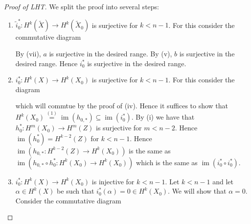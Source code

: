 \documentclass[A4paper, british]{amsart}
\theoremstyle{darkgreentheorem}
\theoremstyle{darkbluedefinition}
\theoremstyle{darkredexample}
\theoremstyle{remark}
\DeclareMathOperator{\im}{im}
\newcommand{\1}{\mathbbm{1}}
\newcommand{\op}{\oplus}
\newcommand{\sub}{\subseteq}
\begin{document}
\begin{proof}[Proof of LHT]
    We split the proof into several steps:
    \begin{enumerate}
	\item $\tilde{i}_{0}^{*}\colon H^{k}(\tilde{X})\to H^{k}(\tilde{X}_{0})$ is surjective for $k<n-1$.
	    For this consider the commutative diagram
	    \begin{center}
	    \end{center}
	    By (vii), $a$ is surjective in the desired range.
	    By (v), $b$ is surjective in the desired range.
	    Hence $i_{0}^{*}$ is surjective in the desired range.
	\item $i_{0}^{*}\colon H^{k}(X)\to H^{k}(X_{0})$ is surjective for $k<n-1$.
	    For this consider the diagram
	    \begin{center}
	    \end{center}
	    which will commtue by the proof of (iv).
	    Hence it suffices to show that $H^{k}(X_{0})\overset{(1)}{=}\im(h_{0,*})\sub \im(i_{0}^{*})$.
	    By (i) we have that $h_{0}^{*}\colon H^{m}(X_{0})\to H^{m}(Z)$ is surjective for $m<n-2$.
	    Hence $\im(h_{0}^{*})=H^{k-2}(Z)$ for $k<n-1$.
	    Hence $\im(h_{0,*}\colon H^{k-2}(Z)\to H^{k}(X_{0}))$ is the same as $\im(h_{0,*}\circ h_{0}^{*}\colon H^{k}(X_{0})\to H^{k}(X_{0}))$ which is the same as $\im(i_{0}^{*}\circ i_{0}^{*})$.
	\item $i_{0}^{*}\colon H^{k}(X)\to H^{k}(X_{0})$ is injective for $k<n-1$.
	    Let $k<n-1$ and let $\alpha\in H^{k}(X)$ be such that $i_{0}^{*}(\alpha)=0\in H^{k}(X_{0})$.
	    We will show that $\alpha=0$.
	    Consider the commutative diagram
	    \begin{center}
\end{center}
\end{enumerate}
\end{proof}
\end{document}
